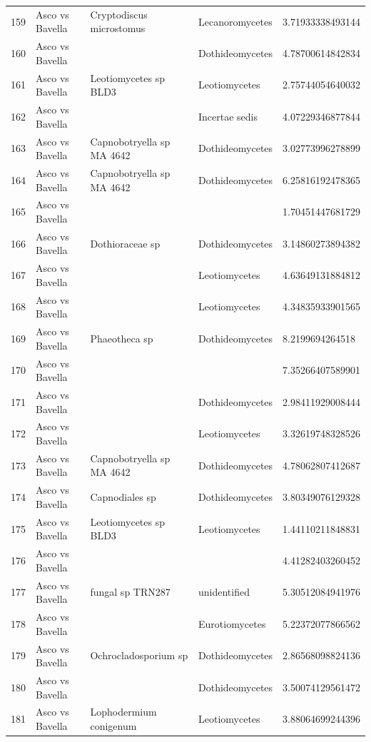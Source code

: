 \documentclass[12pt]{article}\usepackage[]{graphicx}\usepackage[]{color}
\numberwithin{figure}{section}
\begin{document}
\begin{table}[ht]
\begin{tabular}{lllll}
  159 & Asco vs Bavella & Cryptodiscus microstomus & Lecanoromycetes & 3.71933338493144 \\ 
  160 & Asco vs Bavella &  & Dothideomycetes & 4.78700614842834 \\ 
  161 & Asco vs Bavella & Leotiomycetes sp BLD3 & Leotiomycetes & 2.75744054640032 \\ 
  162 & Asco vs Bavella &  & Incertae sedis & 4.07229346877844 \\ 
  163 & Asco vs Bavella & Capnobotryella sp MA 4642 & Dothideomycetes & 3.02773996278899 \\ 
  164 & Asco vs Bavella & Capnobotryella sp MA 4642 & Dothideomycetes & 6.25816192478365 \\ 
  165 & Asco vs Bavella &  &  & 1.70451447681729 \\ 
  166 & Asco vs Bavella & Dothioraceae sp & Dothideomycetes & 3.14860273894382 \\ 
  167 & Asco vs Bavella &  & Leotiomycetes & 4.63649131884812 \\ 
  168 & Asco vs Bavella &  & Leotiomycetes & 4.34835933901565 \\ 
  169 & Asco vs Bavella & Phaeotheca sp & Dothideomycetes & 8.2199694264518 \\ 
  170 & Asco vs Bavella &  &  & 7.35266407589901 \\ 
  171 & Asco vs Bavella &  & Dothideomycetes & 2.98411929008444 \\ 
  172 & Asco vs Bavella &  & Leotiomycetes & 3.32619748328526 \\ 
  173 & Asco vs Bavella & Capnobotryella sp MA 4642 & Dothideomycetes & 4.78062807412687 \\ 
  174 & Asco vs Bavella & Capnodiales sp & Dothideomycetes & 3.80349076129328 \\ 
  175 & Asco vs Bavella & Leotiomycetes sp BLD3 & Leotiomycetes & 1.44110211848831 \\ 
  176 & Asco vs Bavella &  &  & 4.41282403260452 \\ 
  177 & Asco vs Bavella & fungal sp TRN287 & unidentified & 5.30512084941976 \\ 
  178 & Asco vs Bavella &  & Eurotiomycetes & 5.22372077866562 \\ 
  179 & Asco vs Bavella & Ochrocladosporium sp & Dothideomycetes & 2.86568098824136 \\ 
  180 & Asco vs Bavella &  & Dothideomycetes & 3.50074129561472 \\ 
  181 & Asco vs Bavella & Lophodermium conigenum & Leotiomycetes & 3.88064699244396 \\ 

\end{tabular}
\end{table}
\end{document}
